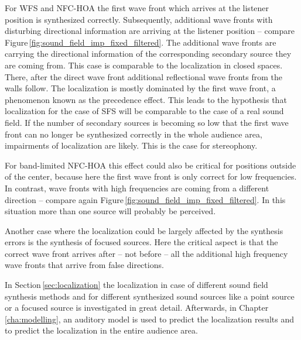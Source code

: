 For \ac{WFS} and \ac{NFC-HOA} the first wave front which arrives at
the listener position is synthesized correctly. Subsequently, additional
wave fronts with disturbing directional information are arriving at the listener
position -- compare Figure\,\ref{fig:sound_field_imp_fixed_filtered}. The
additional wave fronts are carrying the directional information of the corresponding
secondary source they are coming from. This
case is comparable to the localization in closed spaces. There, after the
direct wave front additional reflectional wave fronts from the walls follow.
The localization is mostly dominated by the first wave front, a
phenomenon known as the precedence effect.\autocite[][]{Litovsky1999}
This leads to the hypothesis that localization for the case of \ac{SFS}
will be comparable to the case of a real sound field.
If the number of secondary sources is becoming so low that the first
wave front can no longer be synthesized correctly in the whole audience area,
impairments of localization are likely. This is the case for stereophony.

For band-limited \ac{NFC-HOA} this effect could also be critical for positions outside of the
center, because here the first wave front is only correct for low frequencies.
In contrast, wave fronts with high frequencies are coming from a different direction -- compare again
Figure\,\ref{fig:sound_field_imp_fixed_filtered}. In this situation
more than one source will probably be perceived.

Another case where the localization could be largely affected by the synthesis
errors is the synthesis of focused sources. Here the critical aspect is that the
correct wave front arrives after -- not before -- all the additional high
frequency wave fronts that arrive from false directions.

In Section\,\ref{sec:localization} the localization in case of different sound field
synthesis methods and for different synthesized sound sources like a point source
or a focused source is investigated in great detail. Afterwards, in
Chapter\,\ref{cha:modelling}, an auditory model is used to predict the
localization results and to predict the localization in the entire audience area.


